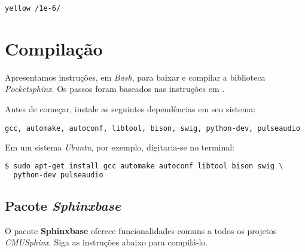 \begin{center}
\texttt{yellow /1e-6/}
\end{center}


\section{Compilação}
\label{sphinxCompile}

Apresentamos instruções, em \textit{Bash}, para baixar e compilar a biblioteca \textit{Pocketsphinx}. Os passos foram baseados nas instruções em \citep{pocketsphinxInstall}.

Antes de começar, instale as seguintes dependências em seu sistema:

\begin{center}
\footnotesize\texttt{gcc, automake, autoconf, libtool, bison, swig, python-dev, pulseaudio}
\end{center}

Em um sistema \emph{Ubuntu}, por exemplo, digitaria-se no terminal:

\begin{lstlisting}[language=Bash]
$ sudo apt-get install gcc automake autoconf libtool bison swig \
  python-dev pulseaudio
\end{lstlisting}


\subsection{Pacote \textit{Sphinxbase}}
\label{sphinxbaseCompile}

O pacote \textbf{Sphinxbase} oferece funcionalidades comuns a todos os projetos \textit{CMUSphinx}. Siga as instruções abaixo para compilá-lo.

